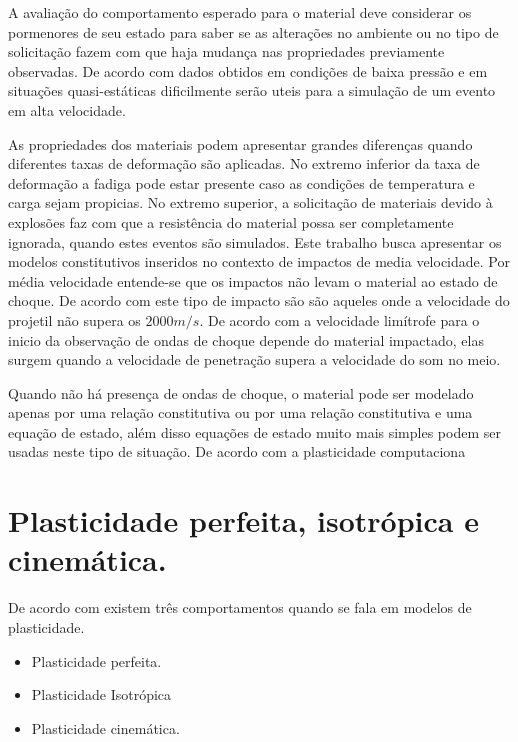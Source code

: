  A avaliação do comportamento esperado para o material deve considerar os pormenores de seu estado para saber se as alterações no ambiente ou no tipo de solicitação fazem com que haja mudança nas propriedades previamente observadas. De acordo com \cite{Zukas} dados obtidos em condições de baixa pressão e em situações quasi-estáticas dificilmente serão uteis para a simulação de um evento em alta velocidade. \par

As propriedades dos materiais podem apresentar grandes diferenças quando diferentes taxas de deformação são aplicadas. No extremo inferior da taxa de deformação a fadiga pode estar presente caso as condições de temperatura e carga sejam propicias. No extremo superior, a solicitação de materiais devido à explosões faz com que a resistência do material possa ser completamente ignorada, quando estes eventos são simulados. Este trabalho busca apresentar os modelos constitutivos inseridos no contexto de impactos de media velocidade. Por média velocidade entende-se que os impactos não levam o material ao estado de choque. De acordo com \cite{Zukas} este tipo de impacto são são aqueles onde a velocidade do projetil não supera os $2000 m/s$. De acordo com \cite{Hazell} a velocidade limítrofe para o inicio da observação de ondas de choque depende do material impactado, elas surgem quando a velocidade de penetração supera a velocidade do som no meio. \par

Quando não há presença de ondas de choque, o material pode ser modelado apenas por uma relação constitutiva ou por uma relação constitutiva e uma equação de estado, além disso equações de estado muito mais simples podem ser usadas neste tipo de situação. De acordo com \cite{hiermaier_2008} a plasticidade computaciona \\

\section{Plasticidade perfeita, isotrópica e cinemática.}

De acordo com \cite{neto_peric_owens_2008} existem três comportamentos quando se fala em modelos de plasticidade. 
\begin{itemize}
    \item Plasticidade perfeita.
    \item Plasticidade Isotrópica
    \item Plasticidade cinemática.
\end{itemize}
\par

